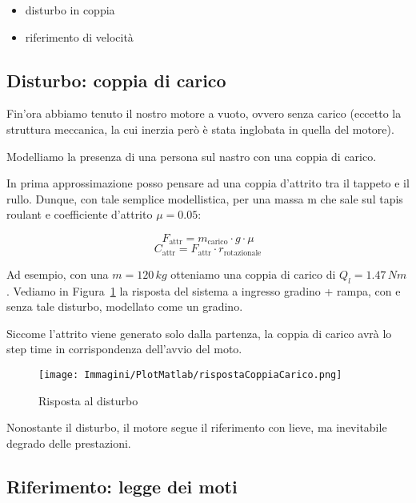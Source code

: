 \documentclass[a4paper,12pt]{article}
\begin{document}
\begin{itemize}
    \item disturbo in coppia
    \item riferimento di velocità
\end{itemize}

\subsection{Disturbo: coppia di carico}

Fin'ora abbiamo tenuto il nostro motore a vuoto, ovvero senza carico (eccetto la struttura meccanica, la cui inerzia però è stata inglobata in quella del motore).

Modelliamo la presenza di una persona sul nastro con una coppia di carico.

In prima approssimazione posso pensare ad una coppia d'attrito tra il tappeto e il rullo. Dunque, con tale semplice modellistica, per una massa m che sale sul tapis roulant e coefficiente d'attrito $\mu=0.05$:

\vspace{0.3cm}

\[
    F_{\text{attr}} = m_{\text{carico}} \cdot g \cdot \mu
\]
\[
    C_{\text{attr}} = F_{\text{attr}} \cdot r_{\text{rotazionale}}
\]

\vspace{0.3cm}

Ad esempio, con una $m=120\,kg$ otteniamo una coppia di carico di $Q_l = 1.47\,Nm$. Vediamo in Figura~\ref{fig: disturbo} la risposta del sistema a ingresso gradino + rampa, con e senza tale disturbo, modellato come un gradino.

Siccome l'attrito viene generato solo dalla partenza, la coppia di carico avrà lo step time in corrispondenza dell'avvio del moto.

\vspace{0.5cm}

\begin{figure}[h!]
    \centering
    \texttt{[image: Immagini/PlotMatlab/rispostaCoppiaCarico.png]}
    \caption{Risposta al disturbo}
    \label{fig: disturbo}
\end{figure}

Nonostante il disturbo, il motore segue il riferimento con lieve, ma inevitabile degrado delle prestazioni.


\subsection{Riferimento: legge dei moti}
\end{document}
